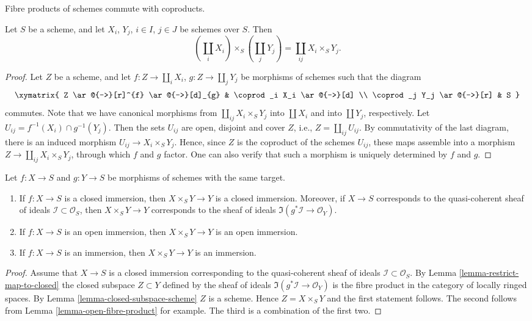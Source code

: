 \begin{lemma}
\label{lemma-fibre-product-commutes-coproduct}
\begin{slogan}
	Fibre products of schemes commute with coproducts.
\end{slogan}
Let $S$ be a scheme, and let $X_i$, $Y_j$,
$i\in I$, $j\in J$ be schemes over $S$. Then
$$
\left(\coprod_i X_i\right)
\times_S\left(\coprod_j Y_j\right)
=\coprod_{ij} X_i\times_S Y_j.
$$
\end{lemma}

\begin{proof}
Let $Z$ be a scheme, and let $f:Z\to\coprod_i X_i$,
$g:Z\to\coprod_j Y_j$ be morphisms of schemes such that the diagram
$$
\xymatrix{
	Z \ar@{->}[r]^{f} \ar@{->}[d]_{g} & \coprod_i X_i \ar@{->}[d] \\
	\coprod_j Y_j \ar@{->}[r] & S
}
$$
commutes.
Note that we have canonical morphisms from
$\coprod_{ij} X_i\times_S Y_j$ into $\coprod X_i$
and into $\coprod Y_j$, respectively.
Let $U_{ij}=f^{-1}(X_i)\cap g^{-1}(Y_j)$.
Then the sets $U_{ij}$ are open, disjoint and cover $Z$,
i.e., $Z=\coprod_{ij}U_{ij}$. By commutativity of the last diagram,
there is an induced morphism $U_{ij}\to X_i\times _S Y_j$.
Hence, since $Z$ is the coproduct of the schemes $U_{ij}$,
these maps assemble into a morphism $Z\to \coprod_{ij} X_i\times_S Y_j$,
through which $f$ and $g$ factor. One can also verify
that such a morphism is uniquely determined by $f$ and $g$.
\end{proof}

\begin{lemma}
\label{lemma-fibre-product-immersion}
Let $f : X \to S$ and $g : Y \to S$ be morphisms of schemes
with the same target.
\begin{enumerate}
\item If $f : X \to S$ is a closed immersion,
then $X \times_S Y \to Y$ is a closed immersion.
Moreover, if $X \to S$ corresponds to the quasi-coherent
sheaf of ideals $\mathcal{I} \subset \mathcal{O}_S$, then
$X \times_S Y \to Y$ corresponds to the sheaf of ideals
$\Im(g^*\mathcal{I} \to \mathcal{O}_Y)$.
\item If $f : X \to S$ is an open immersion,
then $X \times_S Y \to Y$ is an open immersion.
\item If $f : X \to S$ is an immersion,
then $X \times_S Y \to Y$ is an immersion.
\end{enumerate}
\end{lemma}

\begin{proof}
Assume that $X \to S$ is a closed immersion corresponding
to the quasi-coherent sheaf of ideals $\mathcal{I} \subset \mathcal{O}_S$.
By Lemma \ref{lemma-restrict-map-to-closed} the closed subspace
$Z \subset Y$ defined by the sheaf of ideals
$\Im(g^*\mathcal{I} \to \mathcal{O}_Y)$ is the fibre product
in the category of locally ringed spaces.
By Lemma \ref{lemma-closed-subspace-scheme} $Z$ is a scheme.
Hence $Z = X \times_S Y$ and the first statement follows.
The second follows from Lemma \ref{lemma-open-fibre-product}
for example. The third is a combination of
the first two.
\end{proof}

